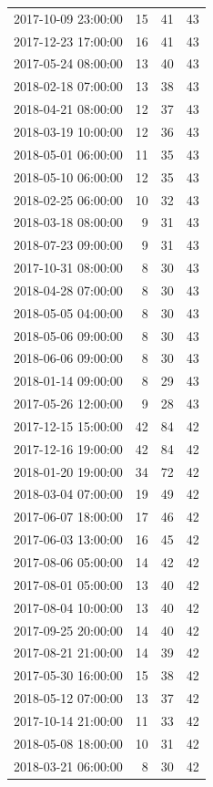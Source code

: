 \begin{tabular}{lrrr}
2017-10-09 23:00:00 & 15 & 41 & 43 \\
2017-12-23 17:00:00 & 16 & 41 & 43 \\
2017-05-24 08:00:00 & 13 & 40 & 43 \\
2018-02-18 07:00:00 & 13 & 38 & 43 \\
2018-04-21 08:00:00 & 12 & 37 & 43 \\
2018-03-19 10:00:00 & 12 & 36 & 43 \\
2018-05-01 06:00:00 & 11 & 35 & 43 \\
2018-05-10 06:00:00 & 12 & 35 & 43 \\
2018-02-25 06:00:00 & 10 & 32 & 43 \\
2018-03-18 08:00:00 & 9 & 31 & 43 \\
2018-07-23 09:00:00 & 9 & 31 & 43 \\
2017-10-31 08:00:00 & 8 & 30 & 43 \\
2018-04-28 07:00:00 & 8 & 30 & 43 \\
2018-05-05 04:00:00 & 8 & 30 & 43 \\
2018-05-06 09:00:00 & 8 & 30 & 43 \\
2018-06-06 09:00:00 & 8 & 30 & 43 \\
2018-01-14 09:00:00 & 8 & 29 & 43 \\
2017-05-26 12:00:00 & 9 & 28 & 43 \\
2017-12-15 15:00:00 & 42 & 84 & 42 \\
2017-12-16 19:00:00 & 42 & 84 & 42 \\
2018-01-20 19:00:00 & 34 & 72 & 42 \\
2018-03-04 07:00:00 & 19 & 49 & 42 \\
2017-06-07 18:00:00 & 17 & 46 & 42 \\
2017-06-03 13:00:00 & 16 & 45 & 42 \\
2017-08-06 05:00:00 & 14 & 42 & 42 \\
2017-08-01 05:00:00 & 13 & 40 & 42 \\
2017-08-04 10:00:00 & 13 & 40 & 42 \\
2017-09-25 20:00:00 & 14 & 40 & 42 \\
2017-08-21 21:00:00 & 14 & 39 & 42 \\
2017-05-30 16:00:00 & 15 & 38 & 42 \\
2018-05-12 07:00:00 & 13 & 37 & 42 \\
2017-10-14 21:00:00 & 11 & 33 & 42 \\
2018-05-08 18:00:00 & 10 & 31 & 42 \\
2018-03-21 06:00:00 & 8 & 30 & 42 \\

\end{tabular}
